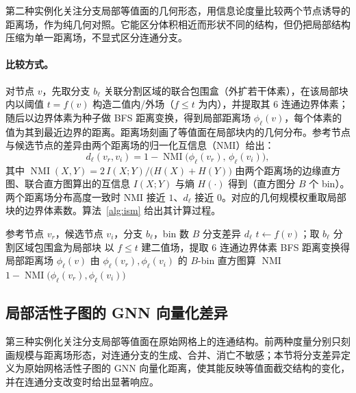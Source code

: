 \documentclass[twocolumn, a4paper, 10pt]{article}
\begin{document}
第二种实例化关注分支局部等值面的几何形态，用信息论度量比较两个节点诱导的距离场，作为纯几何对照。它能区分体积相近而形状不同的结构，但仍把局部结构压缩为单一距离场，不显式区分连通分支。

\paragraph{比较方式。}对节点 $v$，先取分支 $b_\ell$ 关联分割区域的联合包围盒（外扩若干体素），在该局部块内以阈值 $t=f(v)$ 构造二值内/外场（$f\leq t$ 为内），并提取其 $6$ 连通边界体素；随后以边界体素为种子做 BFS 距离变换，得到局部距离场 $\phi_\ell(v)$，每个体素的值为其到最近边界的距离。距离场刻画了等值面在局部块内的几何分布。参考节点与候选节点的差异由两个距离场的归一化互信息（NMI）给出：
\begin{equation}
d_\ell(v_r,v_i)=1-\operatorname{NMI}\bigl(\phi_\ell(v_r),\,\phi_\ell(v_i)\bigr),
\label{eq:ism}
\end{equation}
其中 $\operatorname{NMI}(X,Y)=2\,I(X;Y)/\bigl(H(X)+H(Y)\bigr)$ 由两个距离场的边缘直方图、联合直方图算出的互信息 $I(X;Y)$ 与熵 $H(\cdot)$ 得到（直方图分 $B$ 个 bin）。两个距离场分布高度一致时 NMI 接近 $1$、$d_\ell$ 接近 $0$。对应的几何规模权重取局部块的边界体素数。算法~\ref{alg:ism} 给出其计算过程。

\begin{algorithm}[H]
\caption{\textsc{BranchDiff} 的 ISM 实例}
\label{alg:ism}
\begin{algorithmic}[1]
\Require 参考节点 $v_r$，候选节点 $v_i$，分支 $b_\ell$，bin 数 $B$
\Ensure 分支差异 $d_\ell$
    \State $t \gets f(v)$；取 $b_\ell$ 分割区域包围盒为局部块
    \State 以 $f\!\leq\!t$ 建二值场，提取 $6$ 连通边界体素
    \State BFS 距离变换得局部距离场 $\phi_\ell(v)$
  \EndFor
  \State 由 $\phi_\ell(v_r),\phi_\ell(v_i)$ 的 $B$-bin 直方图算 $\operatorname{NMI}$
  \State \Return $1-\operatorname{NMI}\bigl(\phi_\ell(v_r),\phi_\ell(v_i)\bigr)$
\EndFunction
\end{algorithmic}
\end{algorithm}

\subsection{局部活性子图的 GNN 向量化差异}
\label{sec:gnn}

第三种实例化关注分支局部等值面在原始网格上的连通结构。前两种度量分别只刻画规模与距离场形态，对连通分支的生成、合并、消亡不敏感；本节将分支差异定义为原始网格活性子图的 GNN 向量化距离，使其能反映等值面截交结构的变化，并在连通分支改变时给出显著响应。
\end{document}
